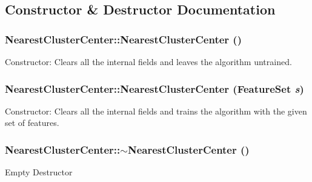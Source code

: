 \subsection{Constructor \& Destructor Documentation}
\hypertarget{classNearestClusterCenter_a91e3450a7df8ef80a80ea9803671bb1e}{
\subsubsection[{NearestClusterCenter}]{\setlength{\rightskip}{0pt plus 5cm}NearestClusterCenter::NearestClusterCenter ()}}
\label{classNearestClusterCenter_a91e3450a7df8ef80a80ea9803671bb1e}
Constructor: Clears all the internal fields and leaves the algorithm untrained. \hypertarget{classNearestClusterCenter_ae3f8e71ca34ae2e0187395c38045f041}{
\subsubsection[{NearestClusterCenter}]{\setlength{\rightskip}{0pt plus 5cm}NearestClusterCenter::NearestClusterCenter (FeatureSet {\em s})}}
\label{classNearestClusterCenter_ae3f8e71ca34ae2e0187395c38045f041}
Constructor: Clears all the internal fields and trains the algorithm with the given set of features. \hypertarget{classNearestClusterCenter_a8b6f7f60937d0e860b117d774d645928}{
\subsubsection[{$\sim$NearestClusterCenter}]{\setlength{\rightskip}{0pt plus 5cm}NearestClusterCenter::$\sim$NearestClusterCenter ()}}
\label{classNearestClusterCenter_a8b6f7f60937d0e860b117d774d645928}
Empty Destructor 

